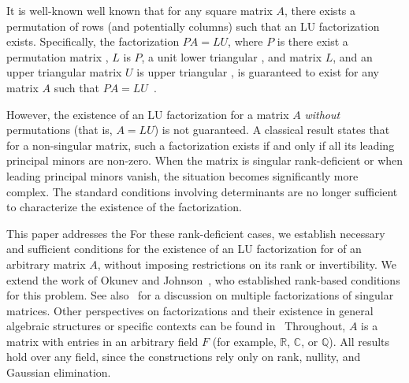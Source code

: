\documentclass[10pt,twoside]{siamart1116}
\numberwithin{theorem}{section}
\providecommand{\DIFadd}[1]{{\protect\color{blue} \sf #1}} %
\providecommand{\DIFdel}[1]{{\protect\color{red} \scriptsize #1}} %
\providecommand{\DIFaddbegin}{} %
\providecommand{\DIFaddend}{} %
\providecommand{\DIFdelbegin}{} %
\providecommand{\DIFdelend}{} %
\begin{document}
It is \DIFdelbegin \DIFdel{well-known }\DIFdelend \DIFaddbegin \DIFadd{well known }\DIFaddend that for any square matrix $A$, there exists a permutation of rows (and potentially columns) such that an LU factorization exists. Specifically, \DIFdelbegin \DIFdel{the factorization $PA = LU$, where $P$ is }\DIFdelend \DIFaddbegin \DIFadd{there exist }\DIFaddend a permutation matrix \DIFdelbegin \DIFdel{, $L$ is }\DIFdelend \DIFaddbegin \DIFadd{$P$, a }\DIFaddend unit lower triangular \DIFdelbegin \DIFdel{, and }\DIFdelend \DIFaddbegin \DIFadd{matrix $L$, and an upper triangular matrix }\DIFaddend $U$ \DIFdelbegin \DIFdel{is upper triangular , is guaranteed to exist for any matrix $A$}\DIFdelend \DIFaddbegin \DIFadd{such that $PA = LU$}\DIFaddend ~\cite{higham_gaussian_2011,lu_numerical_2021}.

However, the existence of an LU factorization for a matrix $A$ \emph{without} permutations (that is, $A = LU$) is not guaranteed. A classical result states that for a non-singular matrix, such a factorization exists if and only if all its leading principal minors are non-zero. When the matrix is \DIFdelbegin \DIFdel{singular }\DIFdelend \DIFaddbegin \DIFadd{rank-deficient }\DIFaddend or when leading principal minors vanish, the situation becomes significantly more complex. The standard conditions involving determinants are no longer sufficient to characterize the existence of the factorization.

\DIFdelbegin \DIFdel{This paper addresses the }\DIFdelend \DIFaddbegin \DIFadd{For these rank-deficient cases, we establish }\DIFaddend necessary and sufficient conditions for the existence of an LU factorization \DIFdelbegin \DIFdel{for }\DIFdelend \DIFaddbegin \DIFadd{of }\DIFaddend an arbitrary matrix $A$, without imposing restrictions on its rank or invertibility. \DIFdelbegin \DIFdel{We extend the work of Okunev and Johnson~\cite{okunev_necessary_2005}, who established rank-based conditions for this problem. See also~\cite{dopico_multiple_2006} for a discussion on multiple factorizations of singular matrices. Other perspectives on factorizations and their existence in general algebraic structures or specific contexts can be found in~\cite{nagarajan_products_1999,johnson_inherited_1989,jeffrey_lu_2010,higham_gaussian_2011}}\DIFdelend \DIFaddbegin \DIFadd{Throughout, $A$ is a matrix with entries in an arbitrary field $F$ (for example, $\mathbb{R}$, $\mathbb{C}$, or $\mathbb{Q}$). All results hold over any field, since the constructions rely only on rank, nullity, and Gaussian elimination}\DIFaddend .
\end{document}
